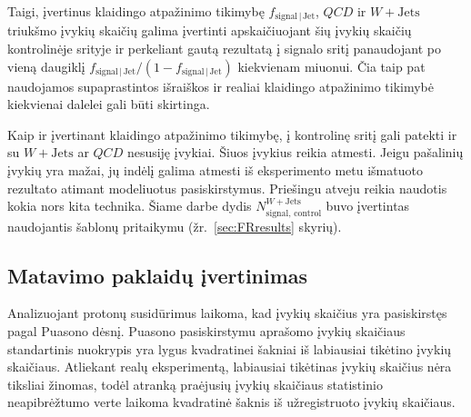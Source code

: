 \documentclass[a4paper, 12pt, oneside]{article}
\newcommand{\WJets}{W\! +\!\mathrm{Jets}}
\newcommand{\QCD}{QC\! D}
\begin{document}
Taigi, įvertinus klaidingo atpažinimo tikimybę $f_{\mathrm{signal} \,| \,\mathrm{Jet}}$, $\QCD$ ir $\WJets$ triukšmo įvykių
skaičių galima įvertinti apskaičiuojant šių įvykių skaičių kontrolinėje srityje ir perkeliant gautą rezultatą į
signalo sritį panaudojant po vieną daugiklį
$f_{\mathrm{signal} \,| \,\mathrm{Jet}}/(1-f_{\mathrm{signal} \,| \,\mathrm{Jet}})$  kiekvienam miuonui.
Čia taip pat naudojamos supaprastintos išraiškos ir realiai klaidingo atpažinimo tikimybė kiekvienai dalelei gali būti skirtinga.

Kaip ir įvertinant klaidingo atpažinimo tikimybę, į kontrolinę sritį gali patekti ir su $\WJets$ ar $\QCD$ nesusiję įvykiai.
Šiuos įvykius reikia atmesti.
Jeigu pašalinių įvykių yra mažai, jų indėlį galima atmesti iš eksperimento metu išmatuoto rezultato atimant modeliuotus
pasiskirstymus.
Priešingu atveju reikia naudotis kokia nors kita technika.
Šiame darbe dydis $N^{\WJets}_{\mathrm{signal, \, control}}$ buvo įvertintas naudojantis šablonų pritaikymu (žr.\ \ref{sec:FRresults} skyrių).


\subsection{Matavimo paklaidų įvertinimas}\label{sec:uncertainties}

Analizuojant protonų susidūrimus laikoma, kad įvykių skaičius yra pasiskirstęs pagal Puasono dėsnį.
Puasono pasiskirstymu aprašomo įvykių skaičiaus standartinis nuokrypis yra lygus kvadratinei šakniai iš labiausiai
tikėtino įvykių skaičiaus.
Atliekant realų eksperimentą, labiausiai tikėtinas įvykių skaičius nėra tiksliai žinomas, todėl atranką praėjusių
įvykių skaičiaus statistinio neapibrėžtumo verte laikoma kvadratinė šaknis iš užregistruoto įvykių skaičiaus.
\end{document}
